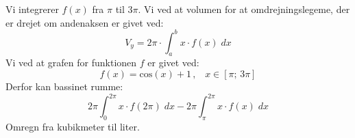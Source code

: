 \begin{tcolorbox}[title=Opgave 3,
    colback=blue!1!white,
    colframe=black,
    colbacktitle=blue!25!white,
    coltitle=red!25!black,
    fonttitle=\bfseries,
    subtitle style={boxrule=0.4pt,
    colback=blue!7!white} ]
        Vi integrerer \(f(x)\) fra \(\pi\) til \(3\pi\).
        Vi ved at volumen for at omdrejningslegeme, der er drejet om andenaksen er givet ved:
        \[V_y=2\pi \cdot \int _a ^b x\cdot f(x)\; dx\]
        Vi ved at grafen for funktionen \(f\) er givet ved:
        \[f(x)=\text{cos}(x)+1\, , \;\;\; x \in [\pi;\,3\pi]\]
        Derfor kan bassinet rumme:
        \[2\pi\int _0 ^{2\pi}x\cdot f(2\pi)\; dx-2\pi \int _\pi ^{2\pi} x\cdot f(x)\; dx\]
        Omregn fra kubikmeter til liter.
\end{tcolorbox}